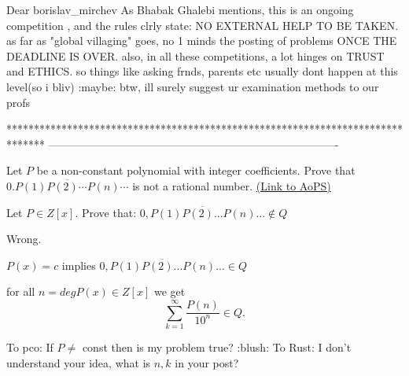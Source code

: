 \begin{solution}
	Dear borislav_mirchev
As Bhabak Ghalebi mentions, this is an ongoing competition , and the rules clrly state: NO EXTERNAL HELP TO BE TAKEN.
as far as "global villaging" goes, no 1 minds the posting of problems ONCE THE DEADLINE IS OVER.
also, in all these competitions, a lot hinges on TRUST and ETHICS. so things like asking frnds, parents etc usually dont happen at this level(so i bliv) :maybe:  
btw, ill surely suggest ur examination methods to our profs 
\end{solution}
*******************************************************************************
-------------------------------------------------------------------------------

\begin{problem}
	Let $P$ be a non-constant polynomial with integer coefficients. Prove that $ \overline{0.P(1)P(2)\cdots P(n) \cdots}$ is not a rational number.
	\flushright \href{https://artofproblemsolving.com/community/c6h172847}{(Link to AoPS)}
\end{problem}



\begin{solution}
	\begin{tcolorbox}Let $ P\in Z[x]$. Prove that: $ \overline{0,P(1)P(2)...P(n)...}\notin Q$\end{tcolorbox}

Wrong.

$ P(x)=c$ implies $ \overline{0,P(1)P(2)...P(n)...}\in Q$
\end{solution}



\begin{solution}
	for all $ n=deg P(x)\in Z[x]$ we get 
\[ \sum_{k=1}^{\infty}\frac{P(n)}{10^n} \in Q.\]
\end{solution}



\begin{solution}
	To pco: If $ P\neq$ const then is my problem true? :blush: 
To Rust: I don't understand your idea, what is $ n,k$ in your post?
\end{solution}



